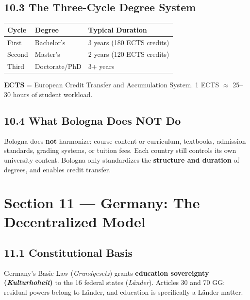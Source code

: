 	\subsection{10.3 The Three-Cycle Degree System}


\begin{center}\small
	\begin{tabularx}{0.85\textwidth}{@{} l l X @{}}
		\toprule
		\textbf{Cycle} & \textbf{Degree} & \textbf{Typical Duration}  \\
		\midrule
		First          & Bachelor's      & 3 years (180 ECTS credits) \\
		Second         & Master's        & 2 years (120 ECTS credits) \\
		Third          & Doctorate/PhD   & 3+ years                   \\
		\bottomrule
	\end{tabularx}
\end{center}

\textbf{ECTS} = European Credit Transfer and Accumulation System. 1 ECTS $\approx$ 25--30 hours of student workload.


	\subsection{10.4 What Bologna Does NOT Do}

	Bologna does \textbf{not} harmonize: course content or curriculum, textbooks, admission standards, grading systems, or tuition fees. Each country still controls its own university content. Bologna only standardizes the \textbf{structure and duration} of degrees, and enables credit transfer.

	\section{Section 11 --- Germany: The Decentralized Model}

	\subsection{11.1 Constitutional Basis}

	Germany's Basic Law (\textit{Grundgesetz}) grants \textbf{education sovereignty (\textit{Kulturhoheit})} to the 16 federal states (\textit{Länder}). Articles 30 and 70 GG: residual powers belong to Länder, and education is specifically a Länder matter.

